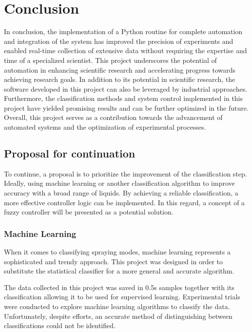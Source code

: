 \chapter{Conclusion}
\label{chap:conclusion}

In conclusion, the implementation of a Python routine for complete automation and integration of the system has improved the precision of experiments and enabled real-time collection of extensive data without requiring the expertise and time of a specialized scientist. 
This project underscores the potential of automation in enhancing scientific research and accelerating progress towards achieving research goals.
In addition to its potential in scientific research, the software developed in this project can also be leveraged by industrial approaches. 
Furthermore, the classification methods and system control implemented in this project have yielded promising results and can be further optimized in the future. Overall, this project serves as a contribution towards the advancement of automated systems and the optimization of experimental processes.

\section{Proposal for continuation}

To continue, a proposal is to prioritize the improvement of the classification step. 
Ideally, using machine learning or another classification algorithm to improve accuracy with a broad range of liquids.
By achieving a reliable classification, a more effective controller logic can be implemented. 
In this regard, a concept of a fuzzy controller will be presented as a potential solution.

\subsection{Machine Learning}

    When it comes to classifying spraying modes, machine learning represents a sophisticated and trendy approach.
    This project was designed in order to substitute the statistical classifier for a more general and accurate algorithm.
    
    The data collected in this project was saved in 0.5s samples together with its classification allowing it to be used for supervised learning.
    Experimental trials were conducted to explore machine learning algorithms to classify the data. Unfortunately, despite efforts, an accurate method of distinguishing between classifications could not be identified.

